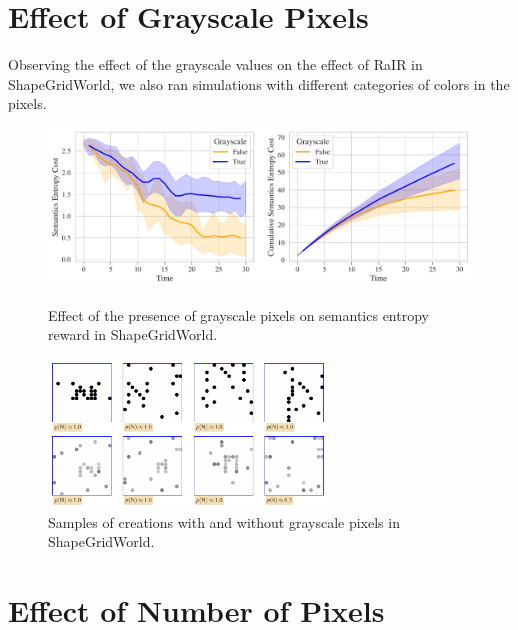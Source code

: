 \section{Effect of Grayscale Pixels}
\label{sec:sgw-grayscale}
Observing the effect of the grayscale values on the effect of RaIR in ShapeGridWorld, we also ran simulations with different categories of colors in the pixels.

\begin{figure}[H]
    \centering
    \includegraphics[width=\textwidth]{images/mode_comparison_sgw.pdf}
    \caption{Effect of the presence of grayscale pixels on semantics entropy reward in ShapeGridWorld.}
    \label{fig:mode-sgw}
    \includegraphics[width=0.66\textwidth]{images/mode_samples_sgw.pdf}
    \caption{Samples of creations with and without grayscale pixels in ShapeGridWorld.}
    \label{fig:mode-samples-sgw}
\end{figure}

\section{Effect of Number of Pixels}
\label{sec:sgw-pixels}

